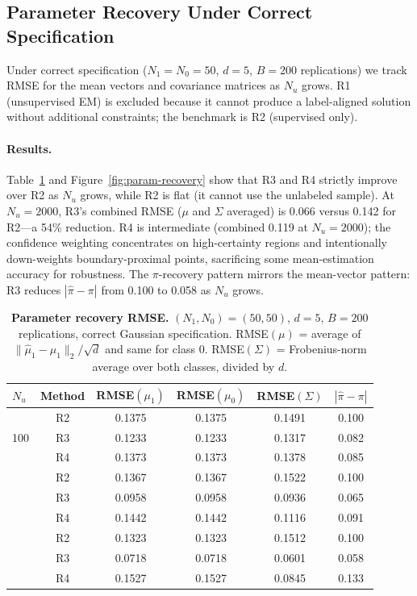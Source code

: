 \documentclass[11pt]{article}
\theoremstyle{definition}
\begin{document}
\subsection{Parameter Recovery Under Correct Specification}
\label{sec:sim-param-recovery}

Under correct specification (\(N_1=N_0=50\), \(d=5\), \(B=200\) replications)
we track RMSE for the mean vectors and covariance matrices as \(N_u\) grows.
R1 (unsupervised EM) is excluded because it cannot produce a label-aligned solution
without additional constraints; the benchmark is R2 (supervised only).

\paragraph{Results.}
Table~\ref{tab:param-recovery} and Figure~\ref{fig:param-recovery} show
that R3 and R4 strictly improve over R2 as \(N_u\) grows, while R2 is
flat (it cannot use the unlabeled sample).
At \(N_u=2000\), R3's combined RMSE (\(\mu\) and \(\Sigma\) averaged)
is 0.066 versus 0.142 for R2---a 54\% reduction.
R4 is intermediate (combined 0.119 at \(N_u=2000\));
the confidence weighting concentrates on high-certainty regions and
intentionally down-weights boundary-proximal points, sacrificing some
mean-estimation accuracy for robustness.
The \(\pi\)-recovery pattern mirrors the mean-vector pattern:
R3 reduces \(|\hat\pi-\pi|\) from 0.100 to 0.058 as \(N_u\) grows.

\begin{table}[t]
\centering
\caption{
  \textbf{Parameter recovery RMSE.}
  $(N_1,N_0) = (50,50)$, $d=5$, $B=200$ replications, correct Gaussian specification.
  RMSE$(\mu)$ = average of $\|\hat\mu_1 - \mu_1\|_2 / \sqrt{d}$ and same for class 0.
  RMSE$(\Sigma)$ = Frobenius-norm average over both classes, divided by $d$.
}
\label{tab:param-recovery}
\begin{tabular}{lccccc}
\toprule
$N_u$ & Method & RMSE$(\mu_1)$ & RMSE$(\mu_0)$ & RMSE$(\Sigma)$ & $|\hat\pi - \pi|$ \\
\midrule
\multirow{3}{*}{100}
  & R2 & 0.1375 & 0.1375 & 0.1491 & 0.100 \\
  & R3 & 0.1233 & 0.1233 & 0.1317 & 0.082 \\
  & R4 & 0.1373 & 0.1373 & 0.1378 & 0.085 \\
\addlinespace
\multirow{3}{*}{500}
  & R2 & 0.1367 & 0.1367 & 0.1522 & 0.100 \\
  & R3 & 0.0958 & 0.0958 & 0.0936 & 0.065 \\
  & R4 & 0.1442 & 0.1442 & 0.1116 & 0.091 \\
\addlinespace
\multirow{3}{*}{2000}
  & R2 & 0.1323 & 0.1323 & 0.1512 & 0.100 \\
  & R3 & 0.0718 & 0.0718 & 0.0601 & 0.058 \\
  & R4 & 0.1527 & 0.1527 & 0.0845 & 0.133 \\
\bottomrule
\end{tabular}
\end{table}
\end{document}
